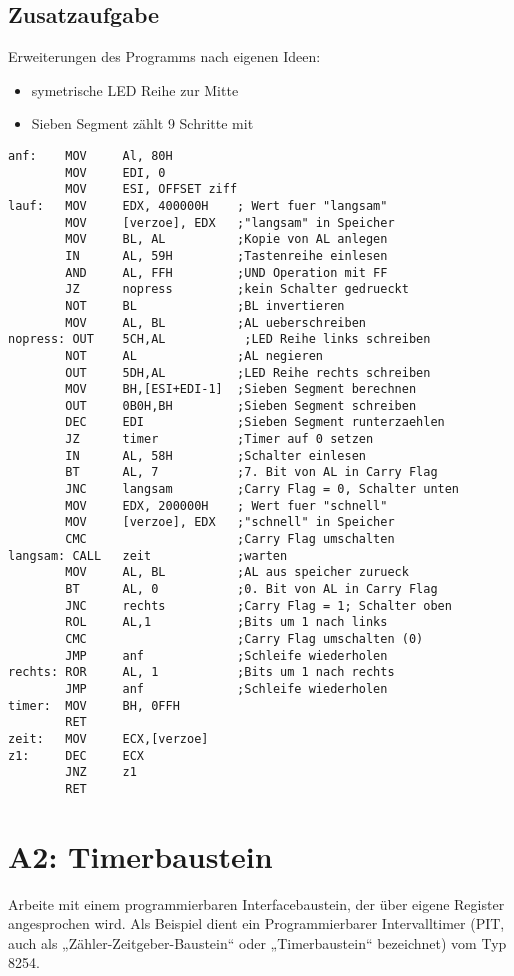 \documentclass[a4paper,10pt,titlepage]{scrartcl}
\begin{document}
\subsection*{Zusatzaufgabe}
Erweiterungen des Programms nach eigenen Ideen:
\begin{itemize}
        \item symetrische LED Reihe zur Mitte
        \item Sieben Segment zählt 9 Schritte mit
\end{itemize}
\begin{lstlisting}
anf:    MOV     Al, 80H
        MOV     EDI, 0 
        MOV     ESI, OFFSET ziff
lauf:   MOV     EDX, 400000H    ; Wert fuer "langsam"
        MOV     [verzoe], EDX   ;"langsam" in Speicher
        MOV     BL, AL          ;Kopie von AL anlegen
        IN      AL, 59H         ;Tastenreihe einlesen
        AND     AL, FFH         ;UND Operation mit FF
        JZ      nopress         ;kein Schalter gedrueckt
        NOT     BL              ;BL invertieren
        MOV     AL, BL          ;AL ueberschreiben
nopress: OUT    5CH,AL           ;LED Reihe links schreiben
        NOT     AL              ;AL negieren
        OUT     5DH,AL          ;LED Reihe rechts schreiben
        MOV     BH,[ESI+EDI-1]  ;Sieben Segment berechnen
        OUT     0B0H,BH         ;Sieben Segment schreiben
        DEC     EDI             ;Sieben Segment runterzaehlen
        JZ      timer           ;Timer auf 0 setzen
        IN      AL, 58H         ;Schalter einlesen
        BT      AL, 7           ;7. Bit von AL in Carry Flag
        JNC     langsam         ;Carry Flag = 0, Schalter unten
        MOV     EDX, 200000H    ; Wert fuer "schnell"
        MOV     [verzoe], EDX   ;"schnell" in Speicher
        CMC                     ;Carry Flag umschalten
langsam: CALL   zeit            ;warten
        MOV     AL, BL          ;AL aus speicher zurueck
        BT      AL, 0           ;0. Bit von AL in Carry Flag
        JNC     rechts          ;Carry Flag = 1; Schalter oben
        ROL     AL,1            ;Bits um 1 nach links
        CMC                     ;Carry Flag umschalten (0)
        JMP     anf             ;Schleife wiederholen
rechts: ROR     AL, 1           ;Bits um 1 nach rechts
        JMP     anf             ;Schleife wiederholen
timer:  MOV     BH, 0FFH
        RET 
zeit:   MOV     ECX,[verzoe]
z1:     DEC     ECX
        JNZ     z1
        RET
\end{lstlisting}

\newpage
\section*{A2: Timerbaustein}
Arbeite mit einem programmierbaren Interfacebaustein, der über eigene Register angesprochen wird. Als Beispiel dient ein Programmierbarer Intervalltimer (PIT, auch als „Zähler-Zeitgeber-Baustein“ oder „Timerbaustein“ bezeichnet) vom Typ 8254.
\end{document}
